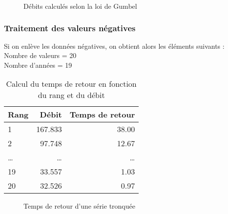 \begin{figure}[H]
    \centering
    \caption{Débits calculés selon la loi de Gumbel}
    \label{graph:debits_gumbel_tronquee}
\end{figure}

\subsubsection{Traitement des valeurs négatives}
Si on enlève les données négatives, on obtient alors les éléments suivants :
Nombre de valeurs = 20 \\
Nombre d'années = 19
\begin{multicols}{2}
    \begin{table}[H]
        \centering
        \begin{tabular}{l|r|r}
            \toprule
            \textbf{Rang} & \textbf{Débit} & \textbf{Temps de retour} \\
            \midrule
            1             & 167.833        & 38.00                    \\
            2             & 97.748         & 12.67                    \\
            \dots         & \dots          & \dots                    \\
            19            & 33.557         & 1.03                    \\
            20            & 32.526         & 0.97                     \\
            \bottomrule
        \end{tabular}
        \caption{Calcul du temps de retour en fonction du rang et du débit}
        \label{tab:serieTronquee2_tempsRetour}
    \end{table}

    \columnbreak

    \begin{figure}[H]
        \centering
        \resizebox*{0.45\textwidth}{!}{
            
        }
        \caption{Temps de retour d'une série tronquée}
        \label{graph:tempsRetour2_serieTronquee}
    \end{figure}
\end{multicols}

